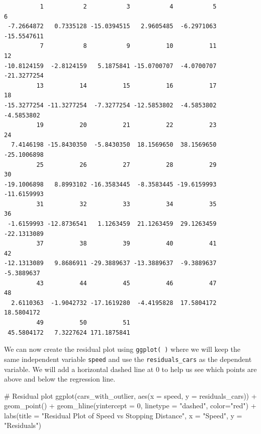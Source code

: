 \documentclass[
  letterpaper,
  DIV=11,
  numbers=noendperiod]{scrreprt}
\newenvironment{Shaded}{\begin{snugshade}}{\end{snugshade}}
\newcommand{\AttributeTok}[1]{\textcolor[rgb]{0.40,0.45,0.13}{#1}}
\newcommand{\CommentTok}[1]{\textcolor[rgb]{0.37,0.37,0.37}{#1}}
\newcommand{\DecValTok}[1]{\textcolor[rgb]{0.68,0.00,0.00}{#1}}
\newcommand{\FunctionTok}[1]{\textcolor[rgb]{0.28,0.35,0.67}{#1}}
\newcommand{\NormalTok}[1]{\textcolor[rgb]{0.00,0.23,0.31}{#1}}
\newcommand{\SpecialCharTok}[1]{\textcolor[rgb]{0.37,0.37,0.37}{#1}}
\newcommand{\StringTok}[1]{\textcolor[rgb]{0.13,0.47,0.30}{#1}}
\begin{document}
\begin{verbatim}
          1           2           3           4           5           6 
 -7.2664872   0.7335128 -15.0394515   2.9605485  -6.2971063 -15.5547611 
          7           8           9          10          11          12 
-10.8124159  -2.8124159   5.1875841 -15.0700707  -4.0700707 -21.3277254 
         13          14          15          16          17          18 
-15.3277254 -11.3277254  -7.3277254 -12.5853802  -4.5853802  -4.5853802 
         19          20          21          22          23          24 
  7.4146198 -15.8430350  -5.8430350  18.1569650  38.1569650 -25.1006898 
         25          26          27          28          29          30 
-19.1006898   8.8993102 -16.3583445  -8.3583445 -19.6159993 -11.6159993 
         31          32          33          34          35          36 
 -1.6159993 -12.8736541   1.1263459  21.1263459  29.1263459 -22.1313089 
         37          38          39          40          41          42 
-12.1313089   9.8686911 -29.3889637 -13.3889637  -9.3889637  -5.3889637 
         43          44          45          46          47          48 
  2.6110363  -1.9042732 -17.1619280  -4.4195828  17.5804172  18.5804172 
         49          50          51 
 45.5804172   7.3227624 171.1875841 
\end{verbatim}

We can now create the residual plot using \texttt{ggplot(\ )} where we
will keep the same independent variable \texttt{speed} and use the
\texttt{residuals\_cars} as the dependent variable. We will add a
horizontal dashed line at 0 to help us see which points are above and
below the regression line.

\begin{Shaded}
\begin{Highlighting}[]
\CommentTok{\# Residual plot}
\FunctionTok{ggplot}\NormalTok{(cars\_with\_outlier, }\FunctionTok{aes}\NormalTok{(}\AttributeTok{x =}\NormalTok{ speed, }\AttributeTok{y =}\NormalTok{ residuals\_cars)) }\SpecialCharTok{+}
  \FunctionTok{geom\_point}\NormalTok{() }\SpecialCharTok{+}
  \FunctionTok{geom\_hline}\NormalTok{(}\AttributeTok{yintercept =} \DecValTok{0}\NormalTok{, }\AttributeTok{linetype =} \StringTok{"dashed"}\NormalTok{, }\AttributeTok{color=}\StringTok{"red"}\NormalTok{) }\SpecialCharTok{+}
  \FunctionTok{labs}\NormalTok{(}\AttributeTok{title =} \StringTok{"Residual Plot of Speed vs Stopping Distance"}\NormalTok{, }\AttributeTok{x =} \StringTok{"Speed"}\NormalTok{, }\AttributeTok{y =} \StringTok{"Residuals"}\NormalTok{)}
\end{Highlighting}
\end{Shaded}
\end{document}
